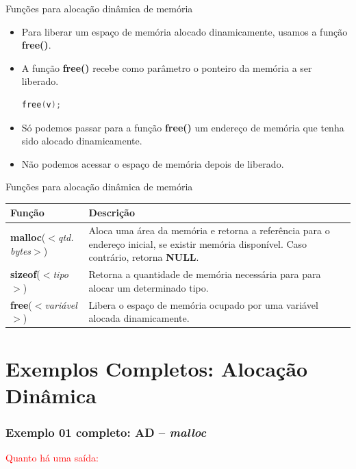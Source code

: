 \begin{frame}[fragile,c]{Funções para alocação dinâmica de memória}
  \begin{itemize}[<+->]
    \item Para liberar um espaço de memória alocado dinamicamente, usamos a função \textbf{free()}.
    \item A função \textbf{free()} recebe como parâmetro o ponteiro da memória a ser liberado.
\begin{lstlisting}[language=C]
free(v);
\end{lstlisting}
    \item Só podemos passar para a função \textbf{free()} um endereço de memória que tenha sido alocado dinamicamente.
    \item Não podemos acessar o espaço de memória depois de liberado.
  \end{itemize}  
\end{frame}

\begin{frame}[fragile,c]{Funções para alocação dinâmica de memória}
  \begin{table}
   \centering
    \begin{tabular}{p{4cm}p{6cm}}
      \hline \textbf{Função} & \textbf{Descrição} \\
      \hline  \textbf{malloc}(\textit{$<$qtd. bytes$>$}) & Aloca uma área da memória e retorna a referência para o endereço inicial, se existir memória disponível. Caso contrário, retorna \textbf{NULL}.  \\
      \hline \textbf{sizeof}(\textit{$<$tipo$>$})  & Retorna a quantidade de memória necessária para para alocar um determinado tipo.\\
      \hline \textbf{free}(\textit{$<$variável$>$})  & Libera o espaço de memória ocupado por uma variável alocada dinamicamente.\\
      \hline
    \end{tabular}
  \end{table} 
\end{frame}

\section{Exemplos Completos: Alocação Dinâmica}

\begin{frame}[allowframebreaks=0.9, c]

\frametitle{Exemplo 01 completo: AD -- \textit{malloc}}


\pause
\textcolor{red}{Quanto há uma saída:}
\end{frame}

